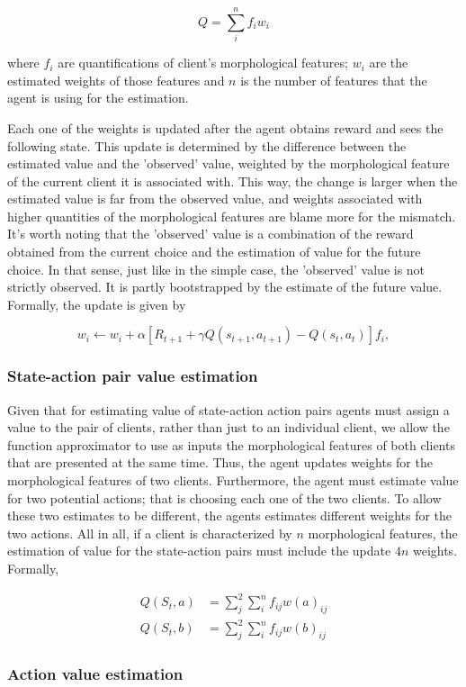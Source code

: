 \documentclass{article}
\begin{document}
\begin{equation}
Q=\sum_{i}^{n} f_{i} w_{i}
\label{equation:action_value_gen}
\end{equation}

where $f_i$ are quantifications of client's morphological features; $w_i$ are the estimated weights of those features and $n$ is the number of features that the agent is using for the estimation. 

Each one of the weights is updated after the agent obtains reward and sees the following state. This update is determined by the difference between the estimated value and the 'observed' value, weighted by the morphological feature of the current client it is associated with. This way, the change is larger when the estimated value is far from the observed value, and weights associated with higher quantities of  the morphological features are blame more for the mismatch. It's worth noting that the 'observed' value is a combination of the reward obtained from the current choice and the estimation of value for the future choice. In that sense, just like in the simple case, the 'observed' value is not strictly observed. It is partly bootstrapped by the estimate of the future value. Formally, the update is given by

\begin{equation}
w_i\leftarrow w_i +\alpha [R_{t+1}+\gamma Q(s_{t+1},a_{t+1})-Q(s_t,a_t)]f_i,
\end{equation}


\subsubsection{State-action pair value estimation}
Given that for estimating value of state-action action pairs agents must assign a value to the pair of clients, rather than just to an individual client, we allow the function approximator to use as inputs the morphological features of both clients that are presented at the same time. Thus, the agent updates weights for the morphological features of two clients. Furthermore, the agent must estimate value for two potential actions; that is choosing each one of the two clients. To allow these two estimates to be different, the agents estimates different weights for the two actions. All in all, if a client is characterized by $n$ morphological features, the estimation of value for the state-action pairs must include the update $4n$ weights. Formally,

\begin{align}
Q(S_t,a)&=\sum_{j}^{2}\sum_{i}^{n} f_{ij} w(a)_{ij} \\
Q(S_t,b)&=\sum_{j}^{2}\sum_{i}^{n} f_{ij} w(b)_{ij} 
\end{align}

\subsubsection{Action value estimation}


%	



\end{document}
